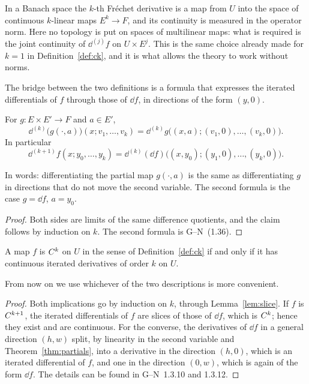 \begin{remark}
  In a Banach space the $k$-th Fréchet derivative is a map from $U$ into the space of
  continuous $k$-linear maps $E^k \to F$, and its continuity is measured in the operator norm.
  Here no topology is put on spaces of multilinear maps: what is required is the joint
  continuity of $\dd^{(j)} f$ on $U \times E^j$. This is the same choice already made for
  $k = 1$ in Definition~\ref{def:ck}, and it is what allows the theory to work without norms.
\end{remark}

The bridge between the two definitions is a formula that expresses the iterated differentials
of $f$ through those of $\dd f$, in directions of the form $(y, 0)$.

\begin{lemma}[Slices]
  \label{lem:slice}
  \leanok
  For $g \colon E \times E' \to F$ and $a \in E'$,
  \[
    \dd^{(k)}\bigl(g(\cdot, a)\bigr)(x; v_1, \dots, v_k)
      = \dd^{(k)} g\bigl((x, a); (v_1, 0), \dots, (v_k, 0)\bigr).
  \]
  In particular
  \[
    \dd^{(k+1)} f(x; y_0, \dots, y_k)
      = \dd^{(k)}(\dd f)\bigl((x, y_0); (y_1, 0), \dots, (y_k, 0)\bigr).
  \]
\end{lemma}

In words: differentiating the partial map $g(\cdot, a)$ is the same as differentiating $g$ in
directions that do not move the second variable. The second formula is the case $g = \dd f$,
$a = y_0$.

\begin{proof}
  \leanok
  Both sides are limits of the same difference quotients, and the claim follows by induction on
  $k$. The second formula is G--N~(1.36).
\end{proof}

\begin{theorem}
  \label{thm:ck-iff-bastiani}
  \leanok
  A map $f$ is $C^{k}$ on $U$ in the sense of Definition~\ref{def:ck} if and only if it has
  continuous iterated derivatives of order $k$ on $U$.
\end{theorem}

From now on we use whichever of the two descriptions is more convenient.

\begin{proof}
  \leanok
  Both implications go by induction on $k$, through Lemma~\ref{lem:slice}. If $f$ is
  $C^{k+1}$, the iterated differentials of $f$ are slices of those of $\dd f$, which is
  $C^{k}$; hence they exist and are continuous. For the converse, the derivatives of $\dd f$
  in a general direction $(h, w)$ split, by linearity in the second variable and
  Theorem~\ref{thm:partials}, into a derivative in the direction $(h, 0)$, which is an iterated
  differential of $f$, and one in the direction $(0, w)$, which is again of the form $\dd f$.
  The details can be found in G--N~1.3.10 and 1.3.12.
\end{proof}

